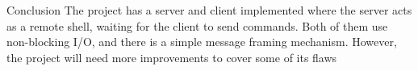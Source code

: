 \documentclass{report}
\begin{document}
\begin{section}{Conclusion}
The project has a server and client implemented where the server acts as a remote shell, waiting for the client to send commands. Both of them use non-blocking I/O, and there is a simple message framing mechanism. However, the project will need more improvements to cover some of its flaws
\end{section}
\end{document}
